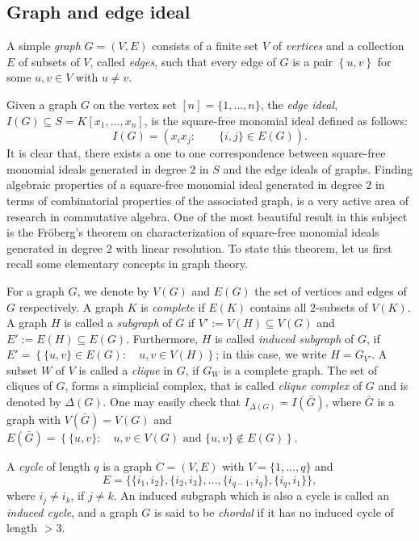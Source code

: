 \documentclass[a4paper,11pt]{amsart}
\theoremstyle{plain}
\theoremstyle{definition}
\theoremstyle{remark}
\begin{document}
\subsection*{Graph and edge ideal}
A simple \textit{graph} $G = (V, E)$ consists of a finite set $V$ of \textit{vertices} and a collection $E$ of subsets of $V$, called \textit{edges}, such that every edge of $G$ is a pair $\left\{ u, v \right\}$ for some $u,v \in V$ with $u \neq v$. 

Given a graph $G$ on the vertex set $[n]=\{1, \ldots, n\}$, the \textit{edge ideal}, $I(G) \subseteq S=K[x_1, \ldots, x_n]$, is the square-free monomial ideal defined as follows:
$$I({G}) = \left( x_ix_j \colon \qquad \{i,j\} \in E(G) \right).$$
It is clear that, there exists a one to one correspondence between square-free monomial ideals generated in degree $2$ in $S$ and the edge ideals of graphs. Finding algebraic properties of a square-free monomial ideal generated in degree $2$ in terms of combinatorial properties of the associated graph, is a very active area of research in commutative algebra. One of the most beautiful result in this subject is the Fr\"oberg's theorem on characterization of square-free monomial ideals generated in degree $2$ with linear resolution. To state this theorem, let us first recall some elementary concepts in graph theory.

For a  graph $G$, we denote by $V(G)$ and $E(G)$ the set of vertices and edges of $G$ respectively. A graph $K$ is \textit{complete} if $E(K)$ contains all $2$-subsets of $V(K)$. A graph $H$ is called a \textit{subgraph} of $G$ if $V':=V(H) \subseteq V(G)$ and $E':=E(H) \subseteq E(G)$. Furthermore, $H$ is called \textit{induced subgraph} of $G$, if $E' = \left\{ \{u,v\} \in E(G) \colon \quad u,v \in V(H) \right\}$; in this case, we write $H=G_{V'}$. A subset $W$ of $V$ is called a \textit{clique} in $G$, if $G_W$ is a complete graph. The set of cliques of $G$, forms a simplicial complex, that is called \textit{clique complex} of $G$ and is denoted by $\Delta(G)$. One may easily check that $I_{\Delta(G)} = I \left( \bar{G} \right)$, where $\bar{G}$ is a graph with $V \left( \bar{G} \right) = V\left( {G} \right)$ and $E \left( \bar{G} \right) = \left\{ \{u,v\} \colon \quad u, v \in V(G) \text{ and } \{u,v\} \notin E(G) \right\}$.

A \textit{cycle} of length $q$ is a graph $C=(V, E)$ with $V=\{1, \ldots, q\}$ and
$$E=\big\{ \{i_1, i_2\}, \{i_2, i_3\}, \ldots, \{i_{q-1}, i_q\}, \{i_q, i_1 \} \big\},$$
where $i_j \neq i_k$, if $j \neq k$. An induced subgraph which is also a cycle is called an \textit{induced cycle}, and a graph $G$ is said to be \textit{chordal} if it has no induced cycle of length $>3$.
\end{document}
